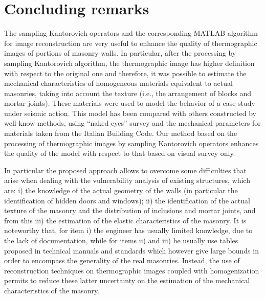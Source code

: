 \documentclass[11pt,a4paper]{article}
\begin{document}



\section{Concluding remarks}

The sampling Kantorovich operators and the corresponding MATLAB algorithm for image reconstruction are very useful to enhance the quality of thermographic images of portions of masonry walls. In particular, after the processing by sampling Kantorovich algorithm, the thermographic image has higher definition with respect to the original one and therefore, it was possible to estimate the mechanical characteristics of homogeneous materials equivalent to actual masonries, taking into account the texture (i.e., the arrangement of blocks and mortar joints). These materials were used to model the behavior of a case study under seismic action. This model has been compared with others constructed by well-know methods, using ``naked eyes'' survey and the mechanical parameters for materials taken from the Italian Building Code. Our method based on the processing of thermographic images by sampling Kantorovich operators enhances the quality of the model with respect to that based on visual survey only.

\noindent In particular the proposed approach allows to overcome some difficulties that arise when dealing with the vulnerability analysis of existing structures, which are: i) the knowledge of the actual geometry of the walls (in particular the identification of hidden doors and windows); ii) the identification of the actual texture of the masonry and the distribution of inclusions and mortar joints, and from this iii) the estimation of the elastic characteristics of the masonry.
It is noteworthy that, for item i) the engineer has usually limited knowledge, due to the lack of documentation, while for items ii) and iii) he usually use tables proposed in technical manuals and standards which however give large bounds in order to encompass the generality of the real masonries. Instead, the use of reconstruction techniques on thermographic images coupled with homogenization permits to reduce these latter uncertainty on the estimation of the mechanical characteristics of the masonry.


% 
% 
% 
%
% 
% 
% 
\end{document}
